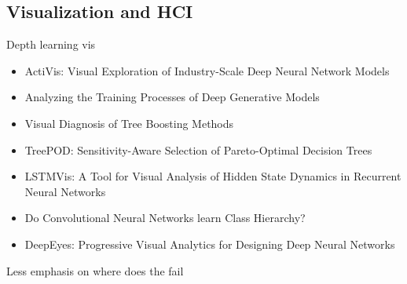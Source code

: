 \subsection{Visualization and HCI}
Depth learning vis
\begin{itemize}
    \item ActiVis: Visual Exploration of Industry-Scale Deep Neural Network Models
    \item Analyzing the Training Processes of Deep Generative Models
    \item Visual Diagnosis of Tree Boosting Methods
    \item TreePOD: Sensitivity-Aware Selection of Pareto-Optimal Decision Trees
    \item LSTMVis: A Tool for Visual Analysis of Hidden State Dynamics in Recurrent Neural Networks
    \item Do Convolutional Neural Networks learn Class Hierarchy?
    \item DeepEyes: Progressive Visual Analytics for Designing Deep Neural Networks
\end{itemize}

Less emphasis on where does the fail
